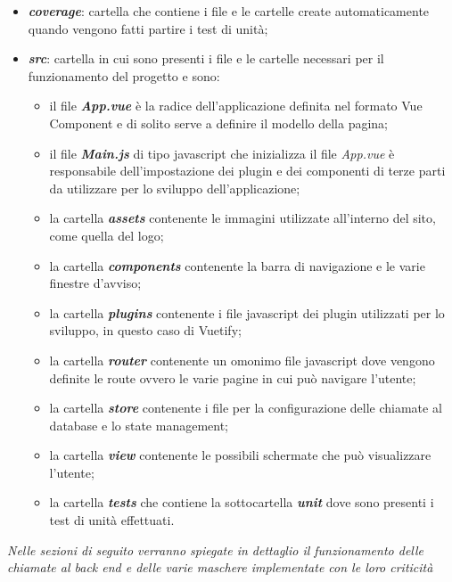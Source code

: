 \begin{itemize}
	\item \textbf{\textit{coverage}}: cartella che contiene i file e le cartelle create automaticamente quando vengono fatti partire i test di unità;
	\item \textbf{\textit{src}}: cartella in cui sono presenti i file e le cartelle necessari per il funzionamento del progetto e sono:
	\begin{itemize}
		\item il file \textbf{\textit{App.vue}} è la radice dell'applicazione definita nel formato Vue Component e di solito serve a definire il modello della pagina;
		\item il file \textbf{\textit{Main.js}} di tipo javascript che inizializza il file \textit{App.vue} è responsabile dell'impostazione dei plugin e dei componenti di terze parti da utilizzare per lo sviluppo dell'applicazione;
		\item la cartella \textbf{\textit{assets}} contenente le immagini utilizzate all'interno del sito, come quella del logo;
		\item la cartella \textbf{\textit{components}} contenente la barra di navigazione e le varie finestre d'avviso;
		\item la cartella \textbf{\textit{plugins}} contenente i file javascript dei plugin utilizzati per lo sviluppo, in questo caso di Vuetify;
		\item la cartella \textbf{\textit{router}} contenente un omonimo file javascript dove vengono definite le route ovvero le varie pagine in cui può navigare l'utente;
		\item la cartella \textbf{\textit{store}} contenente i file per la configurazione delle chiamate al database e lo state management;
		\item la cartella \textbf{\textit{view}} contenente le possibili schermate che può visualizzare l'utente;
		\item la cartella \textbf{\textit{tests}} che contiene la sottocartella \textbf{\textit{unit}} dove sono presenti i test di unità effettuati.
	\end{itemize}
\end{itemize}

\textit{Nelle sezioni di seguito verranno spiegate in dettaglio il funzionamento delle chiamate al back end e delle varie maschere implementate con le loro criticità}


